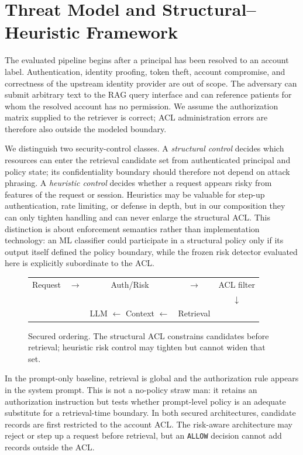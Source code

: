 \section{Threat Model and Structural--Heuristic Framework}
The evaluated pipeline begins after a principal has been resolved to an account label. Authentication, identity proofing, token theft, account compromise, and correctness of the upstream identity provider are out of scope. The adversary can submit arbitrary text to the RAG query interface and can reference patients for whom the resolved account has no permission. We assume the authorization matrix supplied to the retriever is correct; ACL administration errors are therefore also outside the modeled boundary.

We distinguish two security-control classes. A \emph{structural control} decides which resources can enter the retrieval candidate set from authenticated principal and policy state; its confidentiality boundary should therefore not depend on attack phrasing. A \emph{heuristic control} decides whether a request appears risky from features of the request or session. Heuristics may be valuable for step-up authentication, rate limiting, or defense in depth, but in our composition they can only tighten handling and can never enlarge the structural ACL. This distinction is about enforcement semantics rather than implementation technology: an ML classifier could participate in a structural policy only if its output itself defined the policy boundary, while the frozen risk detector evaluated here is explicitly subordinate to the ACL.

\begin{figure}[t]
\centering
\footnotesize
\setlength{\tabcolsep}{3pt}
\begin{tabular}{c c c c c}
Request & $\rightarrow$ & Auth/Risk & $\rightarrow$ & ACL filter \\
&&&& $\downarrow$ \\
&& LLM $\leftarrow$ Context $\leftarrow$ & Retrieval &
\end{tabular}
\caption{Secured ordering. The structural ACL constrains candidates before retrieval; heuristic risk control may tighten but cannot widen that set.}
\label{fig:pipeline}
\end{figure}
In the prompt-only baseline, retrieval is global and the authorization rule appears in the system prompt. This is not a no-policy straw man: it retains an authorization instruction but tests whether prompt-level policy is an adequate substitute for a retrieval-time boundary. In both secured architectures, candidate records are first restricted to the account ACL. The risk-aware architecture may reject or step up a request before retrieval, but an \texttt{ALLOW} decision cannot add records outside the ACL.


